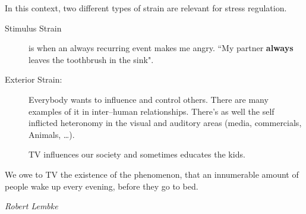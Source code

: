 \documentclass[../Book.Stress_regulation.tex]{subfiles}
\begin{document}
In this context, two different types of strain are relevant for stress regulation.

\begin{description}
\item[Stimulus Strain] is when an always recurring event makes me angry. ``My partner \textbf{always} leaves the toothbrush in the sink". 
\item[Exterior Strain:] Everybody wants to {influence and control others}. There are many examples of it in inter--human relationships. 
There's as well the self inflicted heteronomy in the visual and auditory areas (media, commercials, Animals, \ldots). 

TV influences our society and sometimes educates the kids.
\end{description}

\epigraph{We owe to TV the existence of the phenomenon, that an innumerable amount of people wake up every evening, before they go to bed.}{\textit{Robert Lembke}}
\end{document}
